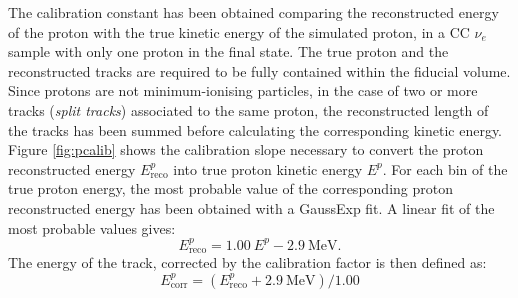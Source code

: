 The calibration constant has been obtained comparing the reconstructed energy of the proton with the true kinetic energy of the simulated proton, in a CC $\nu_{e}$ sample with only one proton in the final state. The true proton and the reconstructed tracks are required to be fully contained within the fiducial volume. Since protons are not minimum-ionising particles, in the case of two or more tracks (\emph{split tracks}) associated to the same proton, the reconstructed length of the tracks has been summed before calculating the corresponding kinetic energy.
Figure \ref{fig:pcalib} shows the calibration slope necessary to convert the proton reconstructed energy $E_{\mathrm{reco}}^{p}$ into true proton kinetic energy $E^{p}$. For each bin of the true proton energy, the most probable value of the corresponding proton reconstructed energy has been obtained with a GaussExp fit. A linear fit of the most probable values gives:
\begin{equation}
E_{\mathrm{reco}}^{p} = 1.00~E^{p} - 2.9~\mathrm{MeV}.
\end{equation}
The energy of the track, corrected by the calibration factor is then defined as:
\begin{equation}
E_{\mathrm{corr}}^{p} = (E_{\mathrm{reco}}^{p} + 2.9~\mathrm{MeV})/1.00
\end{equation}

